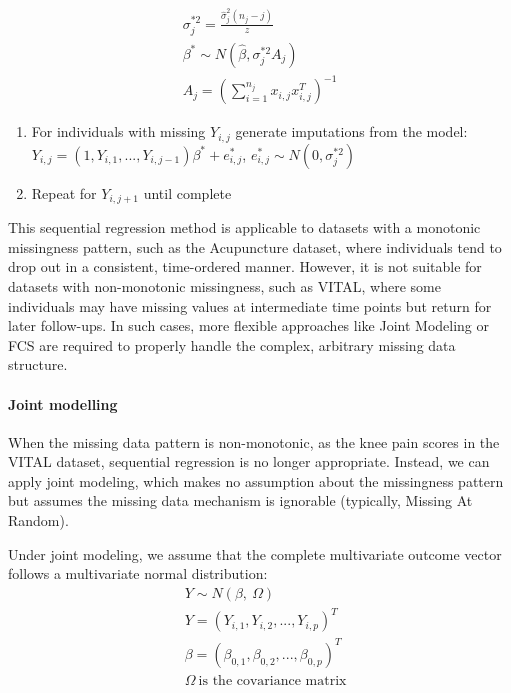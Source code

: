 \documentclass{article}
\begin{document}
\begin{align*}
   \sigma_j^{*2} = \frac{\hat{\sigma}_j^2 (n_j - j)}{z} \\
   \beta^* \sim N(\hat{\beta}, \sigma_j^{*2} A_j) \\
   A_j = (\sum_{i=1}^{n_j} x_{i,j} x_{i,j}^T)^{-1}
   \end{align*}

\begin{enumerate}
\def\labelenumi{\arabic{enumi}.}
\setcounter{enumi}{3}
\item
  For individuals with missing \(Y_{i,j}\) generate imputations from the
  model:
  \(Y_{i,j} = (1,Y_{i,1},...,Y_{i,j-1}) \beta^{*} + e^{*}_{i,j}\),
  \(e_{i,j}^{*} \sim{N} (0,\sigma^{*2}_{j})\)
\item
  Repeat for \(Y_{i,j+1}\) until complete
\end{enumerate}

This sequential regression method is applicable to datasets with a
monotonic missingness pattern, such as the Acupuncture dataset, where
individuals tend to drop out in a consistent, time-ordered manner.
However, it is not suitable for datasets with non-monotonic missingness,
such as VITAL, where some individuals may have missing values at
intermediate time points but return for later follow-ups. In such cases,
more flexible approaches like Joint Modeling or FCS are required to
properly handle the complex, arbitrary missing data structure.

\paragraph{Joint modelling}\label{joint-modelling}

When the missing data pattern is non-monotonic, as the knee pain scores
in the VITAL dataset, sequential regression is no longer appropriate.
Instead, we can apply joint modeling, which makes no assumption about
the missingness pattern but assumes the missing data mechanism is
ignorable (typically, Missing At Random).

Under joint modeling, we assume that the complete multivariate outcome
vector follows a multivariate normal distribution: \begin{align*}
    & Y \sim N(\beta,\ \Omega) \\
    & Y = (Y_{i,1},Y_{i,2},...,Y_{i,p})^{T} \\
    & \beta = (\beta_{0,1},\beta_{0,2},...,\beta_{0,p})^{T} \\
    & \Omega \ \text{is the covariance matrix}
    \end{align*}
\end{document}
